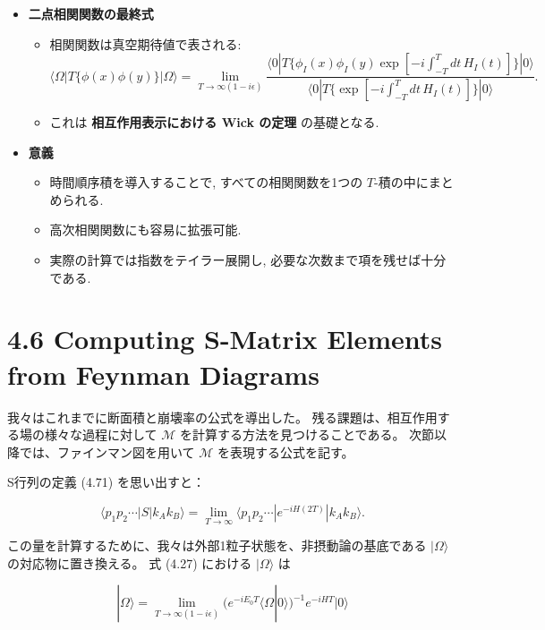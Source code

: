 \documentclass[a4paper,12pt]{article}
\begin{document}
\begin{itemize}
  \item \textbf{二点相関関数の最終式}
  \begin{itemize}
    \item 相関関数は真空期待値で表される:
    \begin{equation*}
      \langle \Omega | T\{\phi(x)\phi(y)\} | \Omega \rangle
      = \lim_{T \to \infty (1-i\epsilon)}
      \frac{\langle 0 | T \{ \phi_I(x)\phi_I(y)\exp[-i\int_{-T}^T dt\, H_I(t)] \} | 0 \rangle}
      {\langle 0 | T \{ \exp[-i\int_{-T}^T dt\, H_I(t)] \} | 0 \rangle}.
    \end{equation*}
    \item これは \textbf{相互作用表示における Wick の定理} の基礎となる.
  \end{itemize}

  \item \textbf{意義}
  \begin{itemize}
    \item 時間順序積を導入することで, すべての相関関数を1つの $T$-積の中にまとめられる.
    \item 高次相関関数にも容易に拡張可能.
    \item 実際の計算では指数をテイラー展開し, 必要な次数まで項を残せば十分である.
  \end{itemize}

\end{itemize}
\newpage
\color{black}
\section*{4.6 Computing S-Matrix Elements from Feynman Diagrams}

我々はこれまでに断面積と崩壊率の公式を導出した。  
残る課題は、相互作用する場の様々な過程に対して $\mathcal{M}$ を計算する方法を見つけることである。  
次節以降では、ファインマン図を用いて $\mathcal{M}$ を表現する公式を記す。  

S行列の定義 (4.71) を思い出すと：

\begin{equation}
\langle p_1 p_2 \cdots | S | k_A k_B \rangle
= \lim_{T\to\infty} \langle p_1 p_2 \cdots | e^{-iH(2T)} | k_A k_B \rangle.
\tag{4.87}
\end{equation}

この量を計算するために、我々は外部1粒子状態を、非摂動論の基底である $|\Omega\rangle$ の対応物に置き換える。  
式 (4.27) における $|\Omega\rangle$ は

\[
|\Omega\rangle = \lim_{T\to\infty(1-i\epsilon)} 
(e^{-iE_0T} \langle \Omega|0\rangle )^{-1} e^{-iHT}|0\rangle
\]
\end{document}
